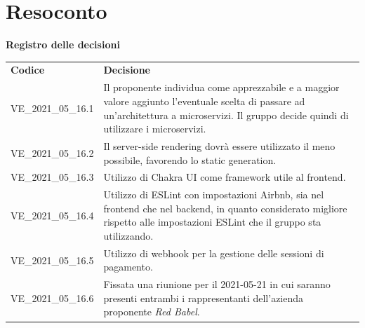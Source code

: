 \documentclass[a4paper]{article}
\begin{document}
\section{Resoconto}
\begin{center}
    \textbf{\Large Registro delle decisioni}\\
    \vspace{10px}
    \begin{table}[h!]
        \centering
        \renewcommand{\arraystretch}{1.8}
        \begin{tabular}{p{200px} p{200px}}
            \rowcolor{logo!70} \textbf{Codice} & \textbf{Decisione}                                                                                                                                                                           \\
            VE\_2021\_05\_16.1                 & Il proponente individua come apprezzabile e a maggior valore aggiunto l'eventuale scelta di passare ad un'architettura a microservizi. Il gruppo decide quindi di utilizzare i microservizi. \\
            VE\_2021\_05\_16.2                 & Il server-side rendering dovrà essere utilizzato il meno possibile, favorendo lo static generation.                                                                                          \\
            VE\_2021\_05\_16.3                 & Utilizzo di Chakra UI come framework utile al frontend.                                                                                                                                      \\
            VE\_2021\_05\_16.4                 & Utilizzo di ESLint con impostazioni Airbnb, sia nel frontend che nel backend, in quanto considerato migliore rispetto alle impostazioni ESLint che il gruppo sta utilizzando.                \\
            VE\_2021\_05\_16.5                 & Utilizzo di webhook per la gestione delle sessioni di pagamento.                                                                                                                             \\
            VE\_2021\_05\_16.6                 & Fissata una riunione per il 2021-05-21 in cui saranno presenti entrambi i rappresentanti dell'azienda proponente \textit{Red Babel}.
        \end{tabular}
    \end{table}
\end{center}
\end{document}
